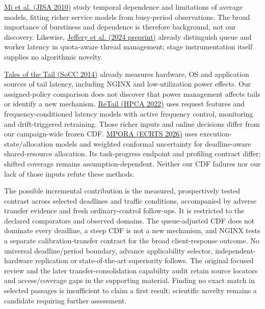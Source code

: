 \documentclass[11pt,a4paper]{article}
\begin{document}
\href{https://link.springer.com/content/pdf/10.1007/s13174-010-0012-9.pdf}{Mi et al. (JISA 2010)}
study temporal dependence and limitations of average models, fitting richer
service models from busy-period observations. The broad importance of
burstiness and dependence is therefore background, not our discovery.
Likewise, \href{https://arxiv.org/html/2407.11582v1}{Jeffery et al. (2024 preprint)}
already distinguish queue and worker latency in quota-aware thread management;
stage instrumentation itself supplies no algorithmic novelty.

\href{https://syslab.cs.washington.edu/papers/latency-socc14.pdf}{Tales of the Tail (SoCC 2014)} \cite{tales}
already measures hardware, OS and application sources of tail latency, including
NGINX and low-utilization power effects. Our assigned-policy comparison does
not discover that power management affects tails or identify a new mechanism.
\href{https://people.csail.mit.edu/delimitrou/papers/2022.hpca.retail.pdf}{ReTail (HPCA 2022)} \cite{retail}
uses request features and frequency-conditioned latency models with active
frequency control, monitoring and drift-triggered retraining. Those richer
inputs and online decisions differ from our campaign-wide frozen CDF.
\href{https://drops.dagstuhl.de/storage/00lipics/lipics-vol375-ecrts2026/html/LIPIcs.ECRTS.2026.17/LIPIcs.ECRTS.2026.17.html}{MPORA (ECRTS 2026)} \cite{mpora}
uses execution-state/allocation models and weighted conformal uncertainty for
deadline-aware shared-resource allocation. Its task-progress endpoint and
profiling contract differ; shifted coverage remains assumption-dependent.
Neither our CDF failures nor our lack of those inputs refute these methods.

The possible incremental contribution is the measured, prospectively tested
contrast across selected deadlines and traffic conditions, accompanied by
adverse transfer evidence and fresh ordinary-control follow-ups. It is restricted to the declared comparators and
observed domains. The queue-adjusted CDF does not dominate every deadline,
a steep CDF is not a new mechanism, and NGINX tests a separate calibration-transfer
contract for the broad client-response outcome.
No universal deadline/period boundary, advance applicability selector,
independent-hardware replication or state-of-the-art superiority follows.
The original focused review and the later transfer-consolidation capability
audit retain source locators and access/coverage gaps in the supporting material.
Finding no exact match in selected passages is insufficient to claim a first
result; scientific novelty remains a candidate requiring further assessment.
\end{document}
